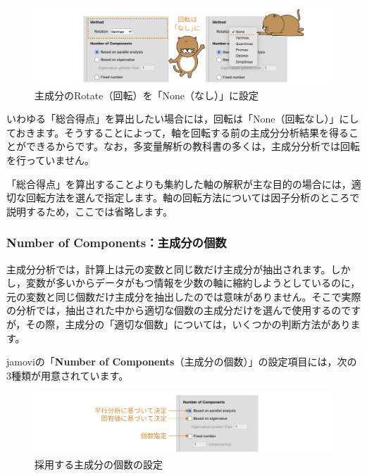 \documentclass[
  12pt,
  a5jpaper,
  lualatex, ja=standard]{bxjsbook}
\begin{document}
\begin{figure}[!ht]

{\centering \includegraphics[width=1\linewidth]{images/factor/pca-rotate} 

}

\caption{主成分のRotate（回転）を「None（なし）」に設定}\label{fig:factor-pca-rotate}
\end{figure}

いわゆる「総合得点」を算出したい場合には，回転は「None（回転なし）」にしておきます。そうすることによって，軸を回転する前の主成分分析結果を得ることができるからです。なお，多変量解析の教科書の多くは，主成分分析では回転を行っていません。

「総合得点」を算出することよりも集約した軸の解釈が主な目的の場合には，適切な回転方法を選んで指定します。軸の回転方法については因子分析のところで説明するため，ここでは省略します。

\hypertarget{subsub:factor-pca-component}{%
\subsubsection*{Number of Components：主成分の個数}\label{subsub:factor-pca-component}}

主成分分析では，計算上は元の変数と同じ数だけ主成分が抽出されます。しかし，変数が多いからデータがもつ情報を少数の軸に縮約しようとしているのに，元の変数と同じ個数だけ主成分を抽出したのでは意味がありません。そこで実際の分析では，抽出された中から適切な個数の主成分だけを選んで使用するのですが，その際，主成分の「適切な個数」については，いくつかの判断方法があります。

jamoviの「\textbf{Number of Components}（主成分の個数）」の設定項目には，次の3種類が用意されています。

\begin{figure}[!ht]

{\centering \includegraphics[width=1\linewidth]{images/factor/pca-n-components} 

}

\caption{採用する主成分の個数の設定}\label{fig:factor-pca-n-components}
\end{figure}
\end{document}

